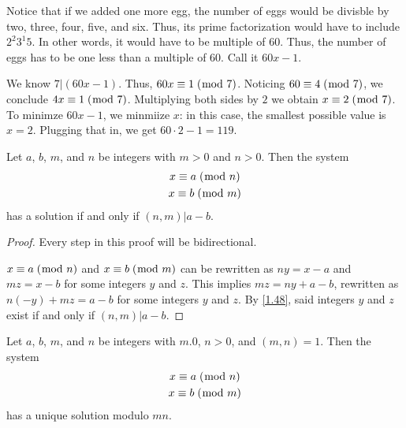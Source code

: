 \documentclass[../main.tex]{subfiles}
\begin{document}
Notice that if we added one more egg, the number of eggs would be divisble by two, three, four, five, and six. Thus, its prime factorization would have to include $2^2 3^1 5$. In other words, it would have to be multiple of $60$. Thus, the number of eggs has to be one less than a multiple of $60$. Call it $60x - 1$.

We know $7 | (60x-1)$. Thus, $60x \equiv 1 \; (\bmod \; 7)$. Noticing $60 \equiv 4 \; (\bmod \; 7)$, we conclude $4x \equiv 1 \; (\bmod \; 7)$. Multiplying both sides by $2$ we obtain $x \equiv 2 \; (\bmod \; 7)$. To minimze $60x - 1$, we minmiize $x$: in this case, the smallest possible value is $x = 2$. Plugging that in, we get $60 \cdot 2 - 1 = 119$.



\begin{thm} \label{3.27}
  Let $a$, $b$, $m$, and $n$ be integers with $m > 0$ and $n > 0$. Then the system
  \begin{gather*}
    x \equiv a \; (\bmod \; n) \\
    x \equiv b \; (\bmod \; m)
  \end{gather*}
  has a solution if and only if $(n, m) | a-b$.
\end{thm}

\begin{proof}
  Every step in this proof will be bidirectional.

  $x \equiv a \; (\bmod \; n)$ and $x \equiv b \; (\bmod \; m)$ can be rewritten as $ny = x - a$ and $mz = x - b$ for some integers $y$ and $z$. This implies $mz = ny + a - b$, rewritten as $n(-y) + mz = a - b$ for some integers $y$ and $z$. By \ref{1.48}, said integers $y$ and $z$ exist if and only if $(n, m)| a - b$.
\end{proof}



\begin{thm} \label{3.28}
  Let $a$, $b$, $m$, and $n$ be integers with $m . 0$, $n > 0$, and $(m, n) = 1$. Then the system
  \begin{gather*}
    x \equiv a \; (\bmod \; n) \\
    x \equiv b \; (\bmod \; m)
  \end{gather*}
  has a unique solution modulo $mn$.
\end{thm}
\end{document}
